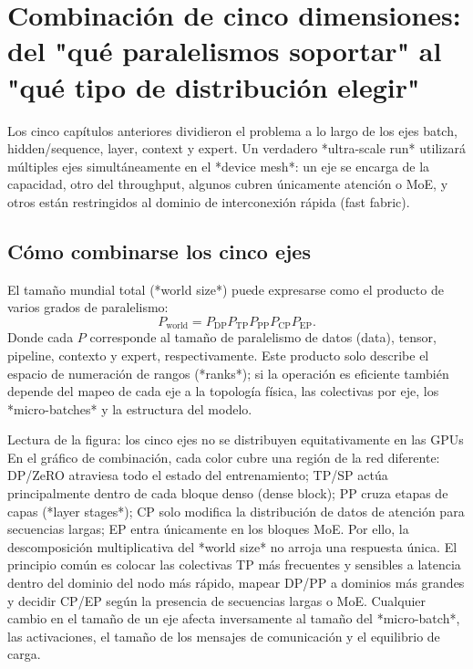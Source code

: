 \section{Combinación de cinco dimensiones: del "qué paralelismos soportar" al "qué tipo de distribución elegir"}

Los cinco capítulos anteriores dividieron el problema a lo largo de los ejes batch, hidden/sequence, layer, context y expert. Un verdadero *ultra-scale run* utilizará múltiples ejes simultáneamente en el *device mesh*: un eje se encarga de la capacidad, otro del throughput, algunos cubren únicamente atención o MoE, y otros están restringidos al dominio de interconexión rápida (fast fabric).

\subsection{Cómo combinarse los cinco ejes}

El tamaño mundial total (*world size*) puede expresarse como el producto de varios grados de paralelismo:
\[
P_{\mathrm{world}}
=P_{\mathrm{DP}}P_{\mathrm{TP}}P_{\mathrm{PP}}P_{\mathrm{CP}}P_{\mathrm{EP}}.
\]
Donde cada $P$ corresponde al tamaño de paralelismo de datos (data), tensor, pipeline, contexto y expert, respectivamente. Este producto solo describe el espacio de numeración de rangos (*ranks*); si la operación es eficiente también depende del mapeo de cada eje a la topología física, las colectivas por eje, los *micro-batches* y la estructura del modelo.



\begin{knowledgebox}{Lectura de la figura: los cinco ejes no se distribuyen equitativamente en las GPUs}
En el gráfico de combinación, cada color cubre una región de la red diferente: DP/ZeRO atraviesa todo el estado del entrenamiento; TP/SP actúa principalmente dentro de cada bloque denso (dense block); PP cruza etapas de capas (*layer stages*); CP solo modifica la distribución de datos de atención para secuencias largas; EP entra únicamente en los bloques MoE. Por ello, la descomposición multiplicativa del *world size* no arroja una respuesta única. El principio común es colocar las colectivas TP más frecuentes y sensibles a latencia dentro del dominio del nodo más rápido, mapear DP/PP a dominios más grandes y decidir CP/EP según la presencia de secuencias largas o MoE. Cualquier cambio en el tamaño de un eje afecta inversamente al tamaño del *micro-batch*, las activaciones, el tamaño de los mensajes de comunicación y el equilibrio de carga.
\end{knowledgebox}

